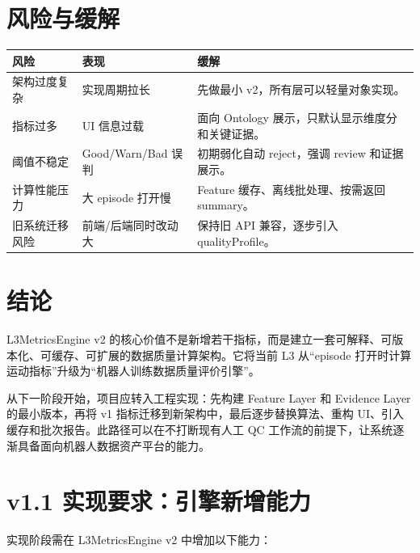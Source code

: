 \documentclass[UTF8,zihao=-4,oneside,openany]{ctexrep}
\begin{document}
\section{风险与缓解}

\begin{longtable}{L{4cm} L{4cm} L{5.8cm}}
\toprule
风险 & 表现 & 缓解 \\
\midrule
架构过度复杂 & 实现周期拉长 & 先做最小 v2，所有层可以轻量对象实现。 \\
指标过多 & UI 信息过载 & 面向 Ontology 展示，只默认显示维度分和关键证据。 \\
阈值不稳定 & Good/Warn/Bad 误判 & 初期弱化自动 reject，强调 review 和证据展示。 \\
计算性能压力 & 大 episode 打开慢 & Feature 缓存、离线批处理、按需返回 summary。 \\
旧系统迁移风险 & 前端/后端同时改动大 & 保持旧 API 兼容，逐步引入 qualityProfile。 \\
\bottomrule
\end{longtable}

\section{结论}

L3MetricsEngine v2 的核心价值不是新增若干指标，而是建立一套可解释、可版本化、可缓存、可扩展的数据质量计算架构。它将当前 L3 从“episode 打开时计算运动指标”升级为“机器人训练数据质量评价引擎”。

从下一阶段开始，项目应转入工程实现：先构建 Feature Layer 和 Evidence Layer 的最小版本，再将 v1 指标迁移到新架构中，最后逐步替换算法、重构 UI、引入缓存和批次报告。此路径可以在不打断现有人工 QC 工作流的前提下，让系统逐渐具备面向机器人数据资产平台的能力。


\newpage
\section*{v1.1 实现要求：引擎新增能力}

实现阶段需在 L3MetricsEngine v2 中增加以下能力：
\end{document}
